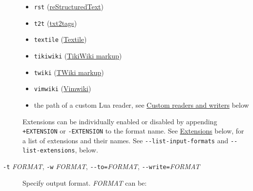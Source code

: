 \documentclass[
]{article}
\begin{document}
\begin{description}
\begin{itemize}
\item
  \texttt{rst}
  (\href{https://docutils.sourceforge.io/docs/ref/rst/introduction.html}{reStructuredText})
\item
  \texttt{t2t} (\href{https://txt2tags.org}{txt2tags})
\item
  \texttt{textile} (\href{https://www.promptworks.com/textile}{Textile})
\item
  \texttt{tikiwiki}
  (\href{https://doc.tiki.org/Wiki-Syntax-Text\#The_Markup_Language_Wiki-Syntax}{TikiWiki
  markup})
\item
  \texttt{twiki}
  (\href{https://twiki.org/cgi-bin/view/TWiki/TextFormattingRules}{TWiki
  markup})
\item
  \texttt{vimwiki} (\href{https://vimwiki.github.io}{Vimwiki})
\item
  the path of a custom Lua reader, see
  \protect\hyperlink{custom-readers-and-writers}{Custom readers and
  writers} below
\end{itemize}

Extensions can be individually enabled or disabled by appending
\texttt{+EXTENSION} or \texttt{-EXTENSION} to the format name. See
\protect\hyperlink{extensions}{Extensions} below, for a list of
extensions and their names. See \texttt{-\/-list-input-formats} and
\texttt{-\/-list-extensions}, below.
\item[\texttt{-t} \emph{FORMAT}, \texttt{-w} \emph{FORMAT},
\texttt{-\/-to=}\emph{FORMAT}, \texttt{-\/-write=}\emph{FORMAT}]
Specify output format. \emph{FORMAT} can be:


\end{description}
\end{document}
